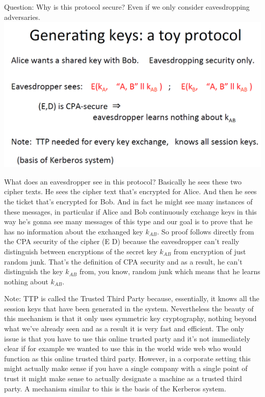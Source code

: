 \documentclass[11pt]{article}
\makeatletter
\def\maxwidth{\ifdim\Gin@nat@width>\linewidth\linewidth
    \else\Gin@nat@width\fi}
\let\Oldincludegraphics\includegraphics
\renewcommand{\includegraphics}[1]{\Oldincludegraphics[width=.8\maxwidth]{#1}}
\makeatother
\begin{document}
Question: Why is this protocol secure? Even if we only consider
eavesdropping adversaries.
\includegraphics{./Images/Security-ToyProtocol.png}

What does an eavesdropper see in this protocol? Basically he sees these
two cipher texts. He sees the cipher text that's encrypted for Alice.
And then he sees the ticket that's encrypted for Bob. And in fact he
might see many instances of these messages, in particular if Alice and
Bob continuously exchange keys in this way he's gonna see many messages
of this type and our goal is to prove that he has no information about
the exchanged key \(k_{AB}\). So proof follows directly from the CPA
security of the cipher (E D) because the eavesdropper can't really
distinguish between encryptions of the secret key \(k_{AB}\) from
encryption of just random junk. That's the definition of CPA security
and as a result, he can't distinguish the key \(k_{AB}\) from, you know,
random junk which means that he learns nothing about \(k_{AB}\).

Note: TTP is called the Trusted Third Party because, essentially, it
knows all the session keys that have been generated in the system.
Nevertheless the beauty of this mechanism is that it only uses symmetric
key cryptography, nothing beyond what we've already seen and as a result
it is very fast and efficient. The only issue is that you have to use
this online trusted party and it's not immediately clear if for example
we wanted to use this in the world wide web who would function as this
online trusted third party. However, in a corporate setting this might
actually make sense if you have a single company with a single point of
trust it might make sense to actually designate a machine as a trusted
third party. A mechanism similar to this is the basis of the Kerberos
system.
\end{document}

